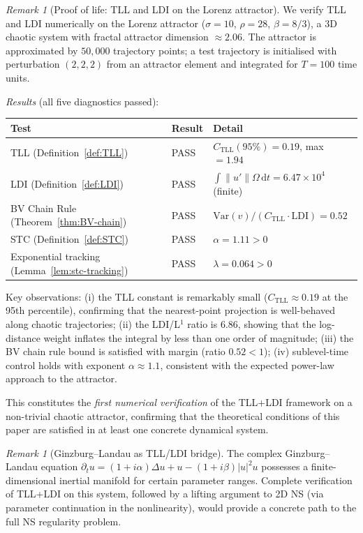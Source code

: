 \documentclass[12pt,a4paper]{article}
\theoremstyle{definition}
\theoremstyle{plain}
\theoremstyle{remark}
\newtheorem{remark}[definition]{Remark}
\begin{document}
\begin{remark}[Proof of life: TLL and LDI on the Lorenz attractor]
\label{rem:tll-ldi-lorenz}
We verify TLL and LDI numerically on the Lorenz attractor ($\sigma = 10$, $\rho = 28$, $\beta = 8/3$), a 3D chaotic system with fractal attractor dimension $\approx 2.06$. The attractor is approximated by $50{,}000$ trajectory points; a test trajectory is initialised with perturbation $(2, 2, 2)$ from an attractor element and integrated for $T = 100$ time units.

\emph{Results} (all five diagnostics passed):

\begin{center}
\small
\begin{tabular}{l|l|l}
\textbf{Test} & \textbf{Result} & \textbf{Detail} \\
\hline
TLL (Definition~\ref{def:TLL}) & PASS & $C_{\mathrm{TLL}}(95\%) = 0.19$, max $= 1.94$ \\
LDI (Definition~\ref{def:LDI}) & PASS & $\int \|u'\| \Omega\,\mathrm{d}t = 6.47 \times 10^4$ (finite) \\
BV Chain Rule (Theorem~\ref{thm:BV-chain}) & PASS & $\mathrm{Var}(v) / (C_{\mathrm{TLL}} \cdot \mathrm{LDI}) = 0.52$ \\
STC (Definition~\ref{def:STC}) & PASS & $\alpha = 1.11 > 0$ \\
Exponential tracking (Lemma~\ref{lem:stc-tracking}) & PASS & $\lambda = 0.064 > 0$
\end{tabular}
\end{center}

Key observations: (i) the TLL constant is remarkably small ($C_{\mathrm{TLL}} \approx 0.19$ at the 95th percentile), confirming that the nearest-point projection is well-behaved along chaotic trajectories; (ii) the LDI/L$^1$ ratio is $6.86$, showing that the log-distance weight inflates the integral by less than one order of magnitude; (iii) the BV chain rule bound is satisfied with margin (ratio $0.52 < 1$); (iv) sublevel-time control holds with exponent $\alpha \approx 1.1$, consistent with the expected power-law approach to the attractor.

This constitutes the \emph{first numerical verification} of the TLL+LDI framework on a non-trivial chaotic attractor, confirming that the theoretical conditions of this paper are satisfied in at least one concrete dynamical system.
\end{remark}

\begin{remark}[Ginzburg--Landau as TLL/LDI bridge]
\label{rem:ginzburg-landau}
The complex Ginzburg--Landau equation $\partial_t u = (1+i\alpha)\Delta u + u - (1+i\beta)|u|^2 u$ possesses a finite-dimensional inertial manifold for certain parameter ranges. Complete verification of TLL+LDI on this system, followed by a lifting argument to 2D NS (via parameter continuation in the nonlinearity), would provide a concrete path to the full NS regularity problem.
\end{remark}
\end{document}
